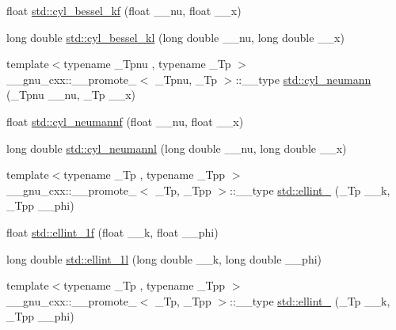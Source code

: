 \begin{DoxyCompactItemize}
\item 
float \hyperlink{group__tr29124__math__spec__func_ga1f50047f9aab0ec8b1a1615fe9fbe32f}{std\+::cyl\+\_\+bessel\+\_\+kf} (float \+\_\+\+\_\+nu, float \+\_\+\+\_\+x)
\item 
long double \hyperlink{group__tr29124__math__spec__func_gac35194b926270d7857d651e06198c7d3}{std\+::cyl\+\_\+bessel\+\_\+kl} (long double \+\_\+\+\_\+nu, long double \+\_\+\+\_\+x)
\item 
{\footnotesize template$<$typename \+\_\+\+Tpnu , typename \+\_\+\+Tp $>$ }\\\+\_\+\+\_\+gnu\+\_\+cxx\+::\+\_\+\+\_\+promote\+\_$<$ \+\_\+\+Tpnu, \+\_\+\+Tp $>$\+::\+\_\+\+\_\+type \hyperlink{group__tr29124__math__spec__func_ga5b7c72ab85e361cbd73f1a3b5f0725a6}{std\+::cyl\+\_\+neumann} (\+\_\+\+Tpnu \+\_\+\+\_\+nu, \+\_\+\+Tp \+\_\+\+\_\+x)
\item 
float \hyperlink{group__tr29124__math__spec__func_ga604c13e8f2bb7cd3c7c91d8b19d6b13a}{std\+::cyl\+\_\+neumannf} (float \+\_\+\+\_\+nu, float \+\_\+\+\_\+x)
\item 
long double \hyperlink{group__tr29124__math__spec__func_gaf8986bae9a523c48d861d233835bda8f}{std\+::cyl\+\_\+neumannl} (long double \+\_\+\+\_\+nu, long double \+\_\+\+\_\+x)
\item 
{\footnotesize template$<$typename \+\_\+\+Tp , typename \+\_\+\+Tpp $>$ }\\\+\_\+\+\_\+gnu\+\_\+cxx\+::\+\_\+\+\_\+promote\+\_$<$ \+\_\+\+Tp, \+\_\+\+Tpp $>$\+::\+\_\+\+\_\+type \hyperlink{group__tr29124__math__spec__func_gae6b3df5556f38a7d72f9b4457d856f9c}{std\+::ellint\+\_} (\+\_\+\+Tp \+\_\+\+\_\+k, \+\_\+\+Tpp \+\_\+\+\_\+phi)
\item 
float \hyperlink{group__tr29124__math__spec__func_ga308d23d70f4b5e848eb7a4173628ef3b}{std\+::ellint\+\_\+1f} (float \+\_\+\+\_\+k, float \+\_\+\+\_\+phi)
\item 
long double \hyperlink{group__tr29124__math__spec__func_ga795383fa51e02351000b410b478d824f}{std\+::ellint\+\_\+1l} (long double \+\_\+\+\_\+k, long double \+\_\+\+\_\+phi)
\item 
{\footnotesize template$<$typename \+\_\+\+Tp , typename \+\_\+\+Tpp $>$ }\\\+\_\+\+\_\+gnu\+\_\+cxx\+::\+\_\+\+\_\+promote\+\_$<$ \+\_\+\+Tp, \+\_\+\+Tpp $>$\+::\+\_\+\+\_\+type \hyperlink{group__tr29124__math__spec__func_gad6dd71db2b3f90d24ff49bf8cf37bc37}{std\+::ellint\+\_} (\+\_\+\+Tp \+\_\+\+\_\+k, \+\_\+\+Tpp \+\_\+\+\_\+phi)
\item 

\end{DoxyCompactItemize}
